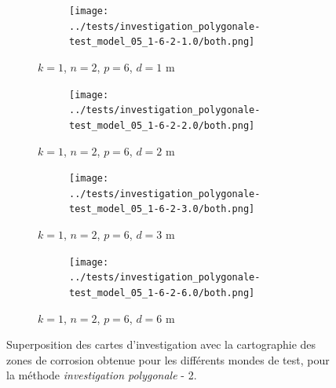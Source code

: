 \documentclass[francais,RandD]{rapportPFE}
\begin{document}
		\begin{figure}[H]
			\centering
			\begin{subfigure}[t]{\linewidth}
				\centering
				\begin{subfigure}[t]{0.2\linewidth}
					\texttt{[image: ../tests/investigation\_polygonale-test\_model\_05\_1-6-2-1.0/both.png]}
				\end{subfigure}
				\caption{$k = 1$, $n = 2$, $p = 6$, $d = 1$ m}
			\end{subfigure}
			\hfill
			\begin{subfigure}[t]{\linewidth}
				\centering
				\begin{subfigure}[t]{0.2\linewidth}
					\texttt{[image: ../tests/investigation\_polygonale-test\_model\_05\_1-6-2-2.0/both.png]}
				\end{subfigure}
				\caption{$k = 1$, $n = 2$, $p = 6$, $d = 2$ m}
			\end{subfigure}
			\hfill
			\begin{subfigure}[t]{\linewidth}
				\centering
				\begin{subfigure}[t]{0.2\linewidth}
					\texttt{[image: ../tests/investigation\_polygonale-test\_model\_05\_1-6-2-3.0/both.png]}
				\end{subfigure}
				\caption{$k = 1$, $n = 2$, $p = 6$, $d = 3$ m}
			\end{subfigure}
			\hfill
			\begin{subfigure}[t]{\linewidth}
				\centering
				\begin{subfigure}[t]{0.2\linewidth}
					\texttt{[image: ../tests/investigation\_polygonale-test\_model\_05\_1-6-2-6.0/both.png]}
				\end{subfigure}
				\caption{$k = 1$, $n = 2$, $p = 6$, $d = 6$ m}
			\end{subfigure}
			\caption{Superposition des cartes d'investigation avec la cartographie des zones de corrosion obtenue pour les différents mondes de test, pour la méthode \textit{investigation polygonale} - 2.}
			\label{fig:investigation_polygonale_resultats_2}
		\end{figure}
\end{document}
